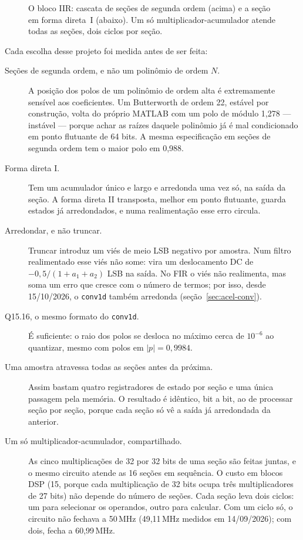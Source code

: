\begin{figure}[htbp]
  \centering
  \caption{O bloco IIR: cascata de seções de segunda ordem (acima) e a seção em
    forma direta~I (abaixo). Um só multiplicador-acumulador atende todas as
    seções, dois ciclos por seção.}
  \label{fig:iir-cascata}
\end{figure}

Cada escolha desse projeto foi medida antes de ser feita:

\begin{description}
  \item[Seções de segunda ordem, e não um polinômio de ordem \(N\).] A posição
    dos polos de um polinômio de ordem alta é extremamente sensível aos
    coeficientes. Um Butterworth de ordem 22, estável por construção, volta do
    próprio MATLAB com um polo de módulo 1,278 --- instável --- porque achar as
    raízes daquele polinômio já é mal condicionado em ponto flutuante de 64
    bits. A mesma especificação em seções de segunda ordem tem o maior polo em
    0,988.
  \item[Forma direta I.] Tem um acumulador único e largo e arredonda uma vez
    só, na saída da seção. A forma direta II transposta, melhor em ponto
    flutuante, guarda estados já arredondados, e numa realimentação esse erro
    circula.
  \item[Arredondar, e não truncar.] Truncar introduz um viés de meio LSB
    negativo por amostra. Num filtro realimentado esse viés não some: vira um
    deslocamento DC de \(-0{,}5/(1 + a_1 + a_2)\) LSB na saída. No FIR o viés
    não realimenta, mas soma um erro que cresce com o número de termos; por
    isso, desde 15/10/2026, o \texttt{conv1d} também arredonda
    (seção~\ref{sec:acel-conv}).
  \item[Q15.16, o mesmo formato do \texttt{conv1d}.] É suficiente: o raio dos
    polos se desloca no máximo cerca de \(10^{-6}\) ao quantizar, mesmo com
    polos em \(|p| = 0{,}9984\).
  \item[Uma amostra atravessa todas as seções antes da próxima.] Assim bastam
    quatro registradores de estado por seção e uma única passagem pela
    memória. O resultado é idêntico, bit a bit, ao de processar seção por
    seção, porque cada seção só vê a saída já arredondada da anterior.
  \item[Um só multiplicador-acumulador, compartilhado.] As cinco multiplicações
    de 32 por 32 bits de uma seção são feitas juntas, e o mesmo circuito
    atende as 16 seções em sequência. O custo em blocos DSP (15, porque cada
    multiplicação de 32 bits ocupa três multiplicadores de 27 bits) não depende
    do número de seções. Cada seção leva dois ciclos: um para selecionar os
    operandos, outro para calcular. Com um ciclo só, o circuito não fechava a
    50\,MHz (49,11\,MHz medidos em 14/09/2026); com dois, fecha a 60,99\,MHz.
\end{description}

